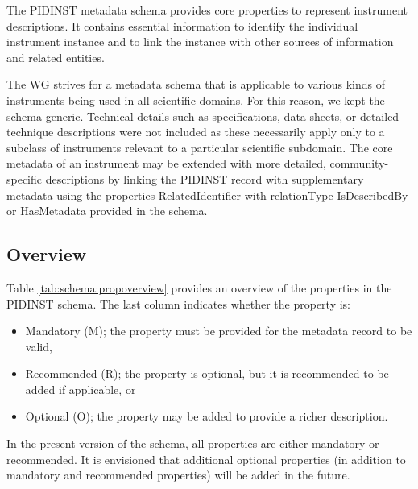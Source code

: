 \documentclass[titlepage=true,twoside=false,DIV=13]{scrartcl}
\begin{document}
The PIDINST metadata schema provides core properties to represent
instrument descriptions.  It contains essential information to
identify the individual instrument instance and to link the instance
with other sources of information and related entities.

The WG strives for a metadata schema that is applicable to various
kinds of instruments being used in all scientific domains.  For this
reason, we kept the schema generic.  Technical details such as
specifications, data sheets, or detailed technique descriptions were
not included as these necessarily apply only to a subclass of
instruments relevant to a particular scientific subdomain.  The core
metadata of an instrument may be extended with more detailed,
community-specific descriptions by linking the PIDINST record with
supplementary metadata using the properties RelatedIdentifier with
relationType IsDescribedBy or HasMetadata provided in the schema.

\subsection{Overview}

Table \ref{tab:schema:propoverview} provides an overview of the
properties in the PIDINST schema.  The last column indicates whether
the property is:
\begin{itemize}
\item Mandatory (M); the property must be provided for the metadata
  record to be valid,
\item Recommended (R); the property is optional, but it is recommended
  to be added if applicable, or
\item Optional (O); the property may be added to provide a richer
  description.
\end{itemize}
In the present version of the schema, all properties are either
mandatory or recommended.  It is envisioned that additional optional
properties (in addition to mandatory and recommended properties) will
be added in the future.
\end{document}
